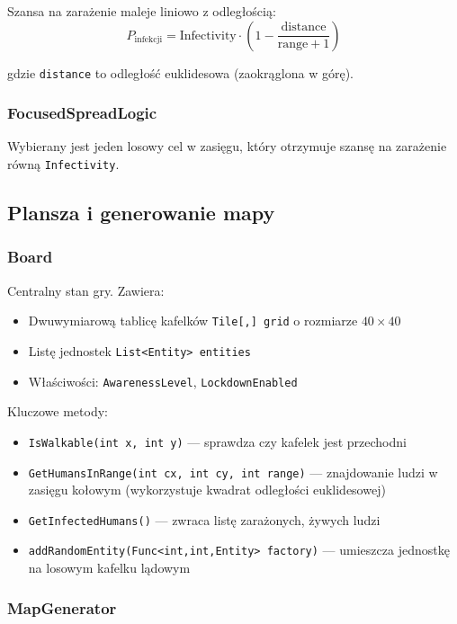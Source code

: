 \documentclass[a4paper,12pt]{article}
\begin{document}
Szansa na zarażenie maleje liniowo z odległością:
\[
P_{\text{infekcji}} = \text{Infectivity} \cdot \left(1 - \frac{\text{distance}}{\text{range} + 1}\right)
\]

gdzie \texttt{distance} to odległość euklidesowa (zaokrąglona w górę).

\subsubsection{FocusedSpreadLogic}

Wybierany jest jeden losowy cel w zasięgu, który otrzymuje szansę na zarażenie równą
\texttt{Infectivity}.

\subsection{Plansza i generowanie mapy}

\subsubsection{Board}

Centralny stan gry. Zawiera:

\begin{itemize}
    \item Dwuwymiarową tablicę kafelków \texttt{Tile[,] grid} o rozmiarze $40 \times 40$
    \item Listę jednostek \texttt{List<Entity> entities}
    \item Właściwości: \texttt{AwarenessLevel}, \texttt{LockdownEnabled}
\end{itemize}

Kluczowe metody:

\begin{itemize}
    \item \texttt{IsWalkable(int x, int y)} --- sprawdza czy kafelek jest przechodni
    \item \texttt{GetHumansInRange(int cx, int cy, int range)} --- znajdowanie ludzi w zasięgu
          kołowym (wykorzystuje kwadrat odległości euklidesowej)
    \item \texttt{GetInfectedHumans()} --- zwraca listę zarażonych, żywych ludzi
    \item \texttt{addRandomEntity(Func<int,int,Entity> factory)} --- umieszcza jednostkę
          na losowym kafelku lądowym
\end{itemize}

\subsubsection{MapGenerator}
\end{document}

